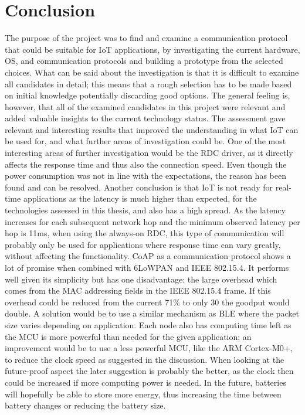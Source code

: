 \section{Conclusion}

The purpose of the project was to find and examine a communication protocol that could be suitable for IoT applications,
	by investigating the current hardware,
	OS,
	and communication protocols and building a prototype from the selected choices.
What can be said about the investigation is that it is difficult to examine all candidates in detail;
	this means that a rough selection has to be made based on initial knowledge potentially discarding good options.
The general feeling is,
	however,
	that all of the examined candidates in this project were relevant and added valuable insights to the current technology status.
The assessment gave relevant and interesting results that improved the understanding in what IoT can be used for,
	and what further areas of investigation could be.
One of the most interesting areas of further investigation would be the RDC driver,
	as it directly affects the response time and thus also the connection speed.
Even though the power consumption was not in line with the expectations,
	the reason has been found and can be resolved.
Another conclusion is that IoT is not ready for real-time applications as the latency is much higher than expected,
	for the technologies assessed in this thesis,
	and also has a high spread.
As the latency increases for each subsequent network hop and the minimum observed latency per hop is 11ms,
	when using the always-on RDC,
	this type of communication will probably only be used for applications where response time can vary greatly,
	without affecting the functionality.
CoAP as a communication protocol shows a lot of promise when combined with 6LoWPAN and IEEE 802.15.4.
It performs well given its simplicity but has one disadvantage:
	the large overhead which comes from the MAC addressing fields in the IEEE 802.15.4 frame.
If this overhead could be reduced from the current 71\% to only 30%
	the goodput would double.
A solution would be to use a similar mechanism as BLE where the packet size varies depending on application.
Each node also has computing time left as the MCU is more powerful  than needed for the given application;
	an improvement would be to use a less powerful MCU,
	like the ARM Cortex-M0+,
	to reduce the clock speed as suggested in the discussion.
When looking at the future-proof aspect the later suggestion is probably the better,
	as the clock then could be increased if more computing power is needed.
In the future,
	batteries will hopefully be able to store more energy,
	thus increasing the time between battery changes or reducing the battery size.


